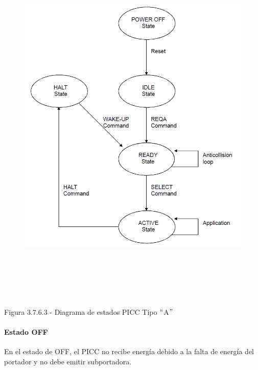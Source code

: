 \begin{figure}[H]
	\begin{center}
		\includegraphics[width=6.27in,height=7.01in]{Norma_ISO/14443-3/media/image7.png}
        \end{center}
\end{figure}



\par

\par
\begin{center}
Figura 3.7.6.3 - Diagrama de estados PICC Tipo $``$A$"$ 
\end{center}
\par

\paragraph{Estado OFF}
En el estado de OFF, el PICC no recibe energía debido a la falta de energía del portador y no debe emitir subportadora.\par

